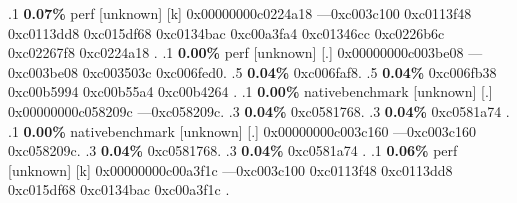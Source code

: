 \begin{profile}
{.1 \textbf{ 0.07\%} perf             [unknown]              [k] 0x00000000c0224a18\newline {} ---0xc003c100\newline {} 0xc0113f48\newline {} 0xc0113dd8\newline {} 0xc015df68\newline {} 0xc0134bac\newline {} 0xc00a3fa4\newline {} 0xc01346cc\newline {} 0xc0226b6c\newline {} 0xc02267f8\newline {} 0xc0224a18\newline {} . 
.1 \textbf{ 0.00\%} perf             [unknown]              [.] 0x00000000c003be08\newline {} ---0xc003be08\newline {} 0xc003503c\newline {} 0xc006fed0. 
.5 \textbf{0.04\%} 0xc006faf8. 
.5 \textbf{0.04\%} 0xc006fb38\newline {} 0xc00b5994\newline {} 0xc00b55a4\newline {} 0xc00b4264\newline {} . 
.1 \textbf{ 0.00\%} nativebenchmark  [unknown]              [.] 0x00000000c058209c\newline {} ---0xc058209c. 
.3 \textbf{0.04\%} 0xc0581768. 
.3 \textbf{0.04\%} 0xc0581a74\newline {} . 
.1 \textbf{ 0.00\%} nativebenchmark  [unknown]              [.] 0x00000000c003c160\newline {} ---0xc003c160\newline {} 0xc058209c. 
.3 \textbf{0.04\%} 0xc0581768. 
.3 \textbf{0.04\%} 0xc0581a74\newline {} . 
.1 \textbf{ 0.06\%} perf             [unknown]              [k] 0x00000000c00a3f1c\newline {} ---0xc003c100\newline {} 0xc0113f48\newline {} 0xc0113dd8\newline {} 0xc015df68\newline {} 0xc0134bac\newline {} 0xc00a3f1c\newline {} . 
}
\end{profile}
